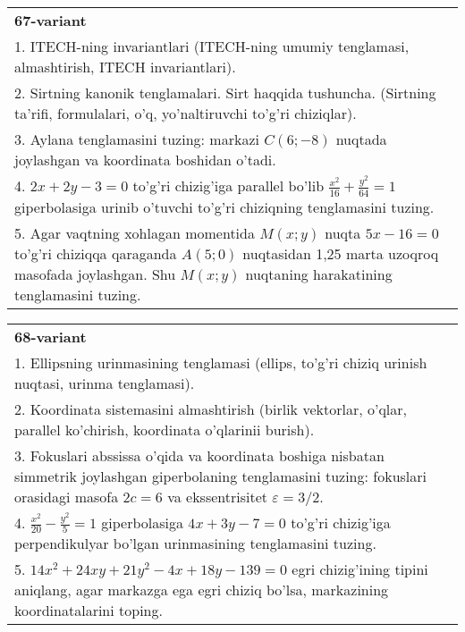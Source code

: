 \documentclass{article}
\begin{document}
\begin{tabular}{m{17cm}}
\textbf{67-variant}\\
1. ITECH-ning invariantlari (ITECH-ning umumiy tenglamasi, almashtirish, ITECH invariantlari).\\

2. Sirtning kanonik tenglamalari. Sirt haqqida tushuncha. (Sirtning ta'rifi, formulalari, o'q, yo'naltiruvchi to'g'ri chiziqlar).\\

3. Aylana tenglamasini tuzing: markazi $C(6;-8)$ nuqtada joylashgan va koordinata boshidan o'tadi.\\

4. $2x + 2y - 3 = 0$ to'g'ri chizig'iga parallel bo'lib $\frac{x^{2}}{16} + \frac{y^{2}}{64} = 1$ giperbolasiga urinib o'tuvchi to'g'ri chiziqning tenglamasini tuzing.  \\

5. Agar vaqtning xohlagan momentida $M(x;y)$ nuqta $5x - 16 = 0$ to'g'ri chiziqqa qaraganda $A(5;0)$ nuqtasidan 1,25 marta uzoqroq masofada joylashgan. Shu $M(x;y)$ nuqtaning harakatining tenglamasini tuzing.  
\end{tabular}
\vspace{1cm}


\begin{tabular}{m{17cm}}
\textbf{68-variant}\\
1. Ellipsning urinmasining tenglamasi (ellips, to'g'ri chiziq urinish nuqtasi, urinma tenglamasi).\\

2. Koordinata sistemasini almashtirish (birlik vektorlar, o'qlar, parallel ko'chirish, koordinata o'qlarinii burish).\\

3. Fokuslari abssissa o'qida va koordinata boshiga nisbatan simmetrik joylashgan giperbolaning tenglamasini tuzing: fokuslari orasidagi masofa $2c=6$ va ekssentrisitet $\varepsilon=3/2$.\\

4. $\frac{x^{2}}{20} - \frac{y^{2}}{5} = 1$ giperbolasiga $4x + 3y - 7 = 0$ to'g'ri chizig'iga perpendikulyar bo'lgan urinmasining tenglamasini tuzing.  \\

5. $14x^{2} + 24xy + 21y^{2} - 4x + 18y - 139 = 0$ egri chizig'ining tipini aniqlang, agar markazga ega egri chiziq bo'lsa, markazining koordinatalarini toping.  
\end{tabular}
\vspace{1cm}
\end{document}
